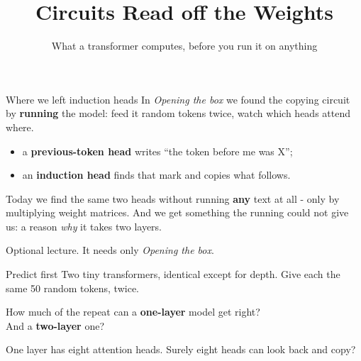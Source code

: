 \documentclass[aspectratio=169]{beamer}
\title{Circuits Read off the Weights}
\subtitle{What a transformer computes, before you run it on anything}
\author{}
\date{}
\newcommand{\keybox}[1]{%
  \begin{tcolorbox}[colback=armblue!8, colframe=armblue, boxrule=0.6pt, arc=2pt]
  #1
  \end{tcolorbox}}
\begin{document}
\begin{frame}[plain]
  \titlepage
\end{frame}

\begin{frame}{Where we left induction heads}
  \vspace{0.5em}
  In \emph{Opening the box} we found the copying circuit by \textbf{running} the model: feed it
  random tokens twice, watch which heads attend where.

  \vspace{0.6em}
  \begin{itemize}
    \item a \textbf{previous-token head} writes ``the token before me was X'';
    \item an \textbf{induction head} finds that mark and copies what follows.
  \end{itemize}

  \vspace{0.8em}
  \keybox{Today we find the same two heads without running \textbf{any} text at all - only by
  multiplying weight matrices. And we get something the running could not give us: a reason
  \emph{why} it takes two layers.}

  \vspace{0.4em}
  {\footnotesize Optional lecture. It needs only \emph{Opening the box}.}
\end{frame}

\begin{frame}{Predict first}
  \vspace{1.0em}
  Two tiny transformers, identical except for depth. Give each the same 50 random tokens, twice.

  \vspace{1.2em}
  \begin{center}
    {\large How much of the repeat can a \textbf{one-layer} model get right?\\[0.3em]
    And a \textbf{two-layer} one?}
  \end{center}

  \vspace{1.2em}
  \begin{center}
    {\footnotesize One layer has eight attention heads. Surely eight heads can look back and copy?}
  \end{center}
\end{frame}
\end{document}
